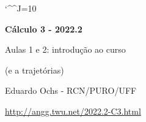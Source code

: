 \documentclass[oneside,12pt]{article}
\begin{document}
\catcode`\^^J=10
\pu
\def\pictgridstyle{\color{GrayPale}\linethickness{0.3pt}}
\def\pictaxesstyle{\linethickness{0.5pt}}
\def\pictnaxesstyle{\color{GrayPale}\linethickness{0.5pt}}
\celllower=2.5pt


\def\u#1{\par{\footnotesize \url{#1}}}

\def\drafturl{http://angg.twu.net/LATEX/2022-2-C3.pdf}
\def\drafturl{http://angg.twu.net/2022.2-C3.html}
\def\draftfooter{\tiny \href{\drafturl}{\jobname{}} \ColorBrown{\shorttoday{} \hours}}



%

\thispagestyle{empty}

\begin{center}

\vspace*{1.2cm}

{\bf \Large Cálculo 3 - 2022.2}

\bsk

Aulas 1 e 2: introdução ao curso

(e a trajetórias)

\bsk

Eduardo Ochs - RCN/PURO/UFF

\url{http://angg.twu.net/2022.2-C3.html}

\end{center}

\newpage

%                           
\end{document}
